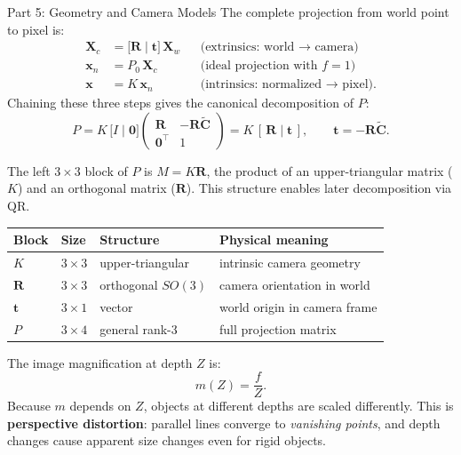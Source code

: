 \documentclass[letterpaper]{article}
\begin{document}
\begin{notes}{Part 5: Geometry and Camera Models}
The complete projection from world point to pixel is:
\begin{align}
  \mathbf{X}_c &= \bigl[\mathbf{R}\mid\mathbf{t}\bigr]\,\mathbf{X}_w
    & &\text{(extrinsics: world $\to$ camera)} \\
  \mathbf{x}_n &= P_0\,\mathbf{X}_c
    & &\text{(ideal projection with }f=1\text{)} \\
  \mathbf{x}   &= K\,\mathbf{x}_n
    & &\text{(intrinsics: normalized $\to$ pixel).}
\end{align}
Chaining these three steps gives the canonical decomposition of $P$:
\begin{equation}
  \boxed{
    P = K\,\bigl[I \mid \mathbf{0}\bigr]
        \begin{pmatrix} \mathbf{R} & -\mathbf{R}\widetilde{\mathbf{C}} \\
                        \mathbf{0}^\top & 1 \end{pmatrix}
      = K\,[\,\mathbf{R} \mid \mathbf{t}\,],
    \qquad \mathbf{t} = -\mathbf{R}\widetilde{\mathbf{C}}.
  }
\end{equation}

The left $3\times 3$ block of $P$ is $M = K\mathbf{R}$, the product of
an upper-triangular matrix ($K$) and an orthogonal matrix ($\mathbf{R}$).
This structure enables later decomposition via QR.


\begin{center}
\begin{tabular}{@{}llll@{}}
  \toprule
  Block & Size & Structure & Physical meaning \\
  \midrule
  $K$           & $3\times 3$ & upper-triangular    & intrinsic camera geometry \\
  $\mathbf{R}$  & $3\times 3$ & orthogonal $SO(3)$  & camera orientation in world \\
  $\mathbf{t}$  & $3\times 1$ & vector              & world origin in camera frame \\
  $P$           & $3\times 4$ & general rank-3      & full projection matrix \\
  \bottomrule
\end{tabular}
\end{center}



The image magnification at depth $Z$ is:
\begin{equation}
  m(Z) = \frac{f}{Z}.
\end{equation}
Because $m$ depends on $Z$, objects at different depths are scaled
differently.  This is \textbf{perspective distortion}: parallel lines
converge to \emph{vanishing points}, and depth changes cause apparent
size changes even for rigid objects.


\end{notes}
\end{document}
